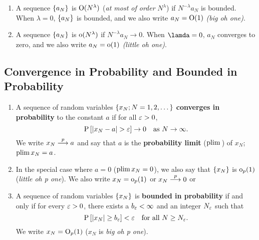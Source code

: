 \documentclass[11pt, oneside, a4paper, article]{article}
\numberwithin{equation}{section}
\begin{document}
\begin{defn}
\item
\begin{enumerate}
\item 
A sequence $\{a_{N}\}$ is $\text{O}( N^{\lambda})$ (\textit{at most of order} $N^{\lambda}$) if 
$N^{-\lambda} a_{N}$ 
is bounded.
When $\lambda = 0$, $\{a_{N}\}$ is bounded, and we also write $a_{N} = \text{O}(1)$ \textit{(big oh one)}.

\item
A  sequence 
$\{a_{N}\}$ is $\text{o}(N^{\lambda})$ if  $N^{-\lambda} a_{N} \to 0$.
When $\lamda = 0$, $a_{N}$ converges to zero, and we also write
$a_{N} = \text{o}(1)$ \textit{(little oh one)}.

\end{enumerate}
\end{defn}

\subsection{Convergence in Probability and Bounded in Probability}

\begin{defn}
\item
\begin{enumerate}
\item 
A sequence of random variables
$\{x_{N}; N = 1, 2, \dots\}$
\textbf{converges in probability} to the constant $a$ if for all $\varepsilon > 0$, 
\begin{equation*}
	\text{P} \left[ |x_{N} - a| > \varepsilon \right] \to 0 \quad \text{as } N \to \infty.
\end{equation*}
We write $x_{N}  \overset{p}{\longrightarrow}  a$  and say that $a$ is the \textbf{probability limit} ($\text{plim} \,$) of $x_{N}$; $\text{plim} \, x_{N} = a$.

\item
	In the special case where $a =0$ ($\text{plim} \, x_{N} = 0$), we also say that $\{x_{N}\}$ is $\text{o}_{p}(1)$ (\textit{little oh p one}).
	We also write $x_{N} = \text{o}_{p}(1)$ or
	$x_{N}  \overset{p}{\longrightarrow}  0$ or
	
\item
	A sequence of random variables $\{x_{N}\}$ is \textbf{bounded in probability} if and only if for every $\varepsilon > 0$, there exists a $b_{\varepsilon} < \infty$ and an integer $N_{\varepsilon}$ such that
\begin{equation*}
\text{P} \left[ | x_{N} | \geq b_{\varepsilon} \right]  < \varepsilon 
\quad \text{for all } N \geq N_{\varepsilon}.
\end{equation*}
We write $x_{N} = \text{O}_{p}(1)$ ($x_{N}$ is \textit{big oh p one}).

\end{enumerate}
\end{defn}
\end{document}
